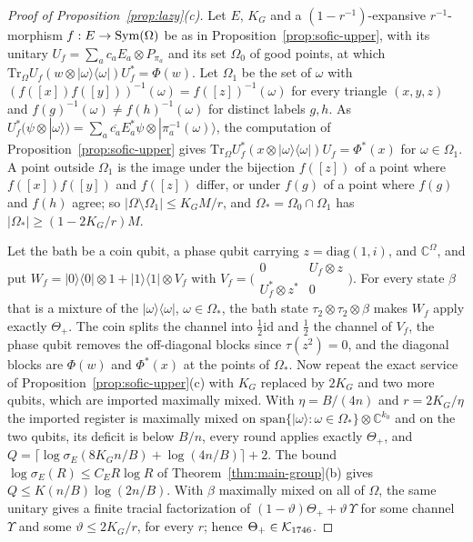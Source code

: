 \begin{proof}[Proof of Proposition~\ref{prop:lazy}(c)]
Let $E$, $K_G$ and a $(1-r^{-1})$-expansive $r^{-1}$-morphism $f:E\to\operatorname{Sym}(\Omega)$ be as in Proposition~\ref{prop:sofic-upper}, with its unitary
$U_f=\sum_ac_aE_a\otimes P_{\pi_a}$ and its set $\Omega_0$ of good points, at which $\mathrm{Tr}_\Omega U_f(w\otimes|\omega\rangle\langle\omega|)U_f^*=\Phi(w)$. Let
$\Omega_1$ be the set of $\omega$ with $(f([x])f([y]))^{-1}(\omega)=f([z])^{-1}(\omega)$ for every triangle $(x,y,z)$ and $f(g)^{-1}(\omega)\ne f(h)^{-1}(\omega)$ for
distinct labels $g,h$. As $U_f^*(\psi\otimes|\omega\rangle)=\sum_a\overline{c_a}E_a^*\psi\otimes|\pi_a^{-1}(\omega)\rangle$, the computation of
Proposition~\ref{prop:sofic-upper} gives $\mathrm{Tr}_\Omega U_f^*(x\otimes|\omega\rangle\langle\omega|)U_f=\Phi^*(x)$ for $\omega\in\Omega_1$. A point outside $\Omega_1$
is the image under the bijection $f([z])$ of a point where $f([x])f([y])$ and $f([z])$ differ, or under $f(g)$ of a point where $f(g)$ and $f(h)$
agree; so $|\Omega\setminus\Omega_1|\le K_GM/r$, and $\Omega_*=\Omega_0\cap\Omega_1$ has $|\Omega_*|\ge(1-2K_G/r)M$.

Let the bath be a coin qubit, a phase qubit carrying $z=\mathrm{diag}(1,i)$, and $\mathbb C^\Omega$, and put
$W_f=|0\rangle\langle0|\otimes1+|1\rangle\langle1|\otimes V_f$ with $V_f=\bigl(\begin{smallmatrix}0&U_f\otimes z\\U_f^*\otimes z^*&0\end{smallmatrix}\bigr)$. For every
state $\beta$ that is a mixture of the $|\omega\rangle\langle\omega|$, $\omega\in\Omega_*$, the bath state $\tau_2\otimes\tau_2\otimes\beta$ makes $W_f$ apply
exactly $\Theta_+$. The coin splits the channel into $\frac12\mathrm{id}$ and $\frac12$ the channel of $V_f$, the phase qubit removes the off-diagonal
blocks since $\tau(z^2)=0$, and the diagonal blocks are $\Phi(w)$ and $\Phi^*(x)$ at the points of $\Omega_*$. Now repeat the exact service of
Proposition~\ref{prop:sofic-upper}(c) with $K_G$ replaced by $2K_G$ and two more qubits, which are imported maximally mixed. With
$\eta=B/(4n)$ and $r=2K_G/\eta$ the imported register is maximally mixed on $\mathrm{span}\{|\omega\rangle:\omega\in\Omega_*\}\otimes\mathbb C^{k_0}$ and on the
two qubits, its deficit is below $B/n$, every round applies exactly $\Theta_+$, and $Q=\lceil\log\sigma_E(8K_Gn/B)+\log(4n/B)\rceil+2$. The bound
$\log\sigma_E(R)\le C_ER\log R$ of Theorem~\ref{thm:main-group}(b) gives $Q\le K(n/B)\log(2n/B)$. With $\beta$ maximally mixed on all of $\Omega$,
the same unitary gives a finite tracial factorization of $(1-\vartheta)\Theta_++\vartheta\,\Upsilon$ for some channel $\Upsilon$ and some $\vartheta\le2K_G/r$, for every $r$; hence
$\Theta_+\in\mathcal K_{1746}$.
\end{proof}

